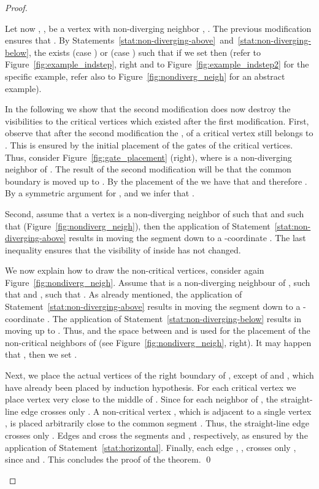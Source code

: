 \documentclass{llncs}
\begin{document}
\begin{proof}
\begin{description}
Let now , , be a vertex with non-diverging neighbor , . The previous modification ensures that .   By Statements~\ref{stat:non-diverging-above}~and~\ref{stat:non-diverging-below},  the exists  (case ) or  (case ) such that if we set  then  (refer to Figure~\ref{fig:example_indstep}, right and to Figure~\ref{fig:example_indstep2} for the specific example, refer also to Figure~\ref{fig:nondiverg_neigh} for an abstract example). 

In the following we show that the second modification does now destroy the visibilities to the critical vertices which existed after the first modification.  First, observe that after the second modification the  ,  of a critical vertex   still belongs to .  This is ensured by the initial placement of the gates of the critical vertices. Thus, consider Figure~\ref{fig:gate_placement} (right), where  is a non-diverging neighbor of . The result of the second modification will be that the common boundary  is moved up to  . By the placement of the  we have that  and therefore . By a symmetric argument for ,  and  we infer that  . 

Second, assume  that a vertex  is a non-diverging neighbor of  such that  and such that  (Figure~\ref{fig:nondiverg_neigh}), then the application of Statement~\ref{stat:non-diverging-above} results in moving the segment   down to a -coordinate . The last inequality ensures that the visibility of  inside  has not changed.

We now explain how to draw the non-critical vertices, consider again Figure~\ref{fig:nondiverg_neigh}. Assume that  is a non-diverging neighbour of  , such that   and  , such that .  As already mentioned,  the application of Statement~\ref{stat:non-diverging-above} results in moving the segment   down to a -coordinate . The application of Statement~\ref{stat:non-diverging-below} results in moving  up to . Thus,  and the space between  and  is used  for the placement of the non-critical neighbors of  (see Figure~\ref{fig:nondiverg_neigh}, right). It may happen that , then we set .

Next, we place the actual vertices of the right boundary of , except of  and , which have already been placed by induction hypothesis. For each critical vertex  we place vertex  very close to the middle of . Since for each neighbor  of   , the straight-line edge  crosses only . A non-critical vertex , which is adjacent to a single vertex , is placed arbitrarily close to the common segment .
Thus, the straight-line edge  crosses only . Edges  and  cross the segments  and , respectively, as ensured by the application of Statement~\ref{stat:horizontal}.
 Finally, each edge , , crosses only , since  and .   This concludes the proof of the theorem. \qed


\end{description}  
\end{proof}
\end{document}
